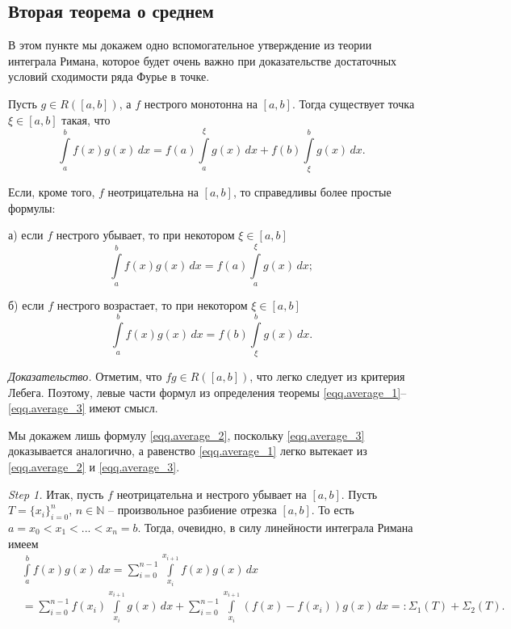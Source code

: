 \subsection{Вторая теорема о среднем}

В этом пункте мы докажем одно вспомогательное утверждение из теории интеграла Римана, которое 
будет очень важно при доказательстве достаточных условий сходимости ряда Фурье в точке.

\begin{theorem}
\label{Th.average}
Пусть $g \in R([a,b])$, а $f$ нестрого монотонна на $[a,b]$. Тогда существует точка $\xi \in [a,b]$ такая, что
\begin{equation}
\label{eqq.average_1}
\int\limits_{a}^{b}f(x)g(x)\,dx = f(a)\int\limits_{a}^{\xi}g(x)\,dx + f(b)\int\limits_{\xi}^{b}g(x)\,dx.
 \end{equation}

Если, кроме того, $f$ неотрицательна на $[a,b]$, то справедливы более простые формулы:

а) если $f$ нестрого убывает, то при некотором $\xi \in [a,b]$
\begin{equation}
\label{eqq.average_2}
\int\limits_{a}^{b}f(x)g(x)\,dx = f(a)\int\limits_{a}^{\xi}g(x)\,dx;
\end{equation}
 
б) если $f$ нестрого возрастает, то при некотором $\xi \in [a,b]$
\begin{equation}
\label{eqq.average_3}
\int\limits_{a}^{b}f(x)g(x)\,dx = f(b)\int\limits_{\xi}^{b}g(x)\,dx.
\end{equation}

\end{theorem}

\textit{Доказательство.} Отметим, что $fg \in R([a,b])$, что легко следует из критерия Лебега. Поэтому, левые части формул из определения теоремы \eqref{eqq.average_1}--\eqref{eqq.average_3} имеют смысл.
    
Мы докажем лишь формулу \eqref{eqq.average_2}, поскольку \eqref{eqq.average_3} доказывается аналогично, а равенство \eqref{eqq.average_1} легко 
вытекает из \eqref{eqq.average_2} и \eqref{eqq.average_3}.

\textit{Step 1.}
Итак, пусть $f$ неотрицательна и нестрого убывает на $[a,b]$. Пусть $T=\{x_{i}\}_{i=0}^{n}$, $n \in \mathbb{N}$ -- произвольное разбиение отрезка $[a,b]$. То есть
$a=x_{0} < x_{1} < ... < x_{n} =b$. Тогда, очевидно, в силу линейности интеграла Римана имеем
\begin{equation}
\begin{split}
\label{eqq.13}
&\int\limits_{a}^{b}f(x)g(x)\,dx = \sum\limits_{i=0}^{n-1}\int\limits_{x_{i}}^{x_{i+1}}f(x)g(x)\,dx\\
&= \sum\limits_{i=0}^{n-1}f(x_{i})\int\limits_{x_{i}}^{x_{i+1}}g(x)\,dx
+\sum\limits_{i=0}^{n-1}\int\limits_{x_{i}}^{x_{i+1}}(f(x)-f(x_{i}))g(x)\,dx =:\Sigma_{1}(T)+\Sigma_{2}(T).
\end{split}
\end{equation}


